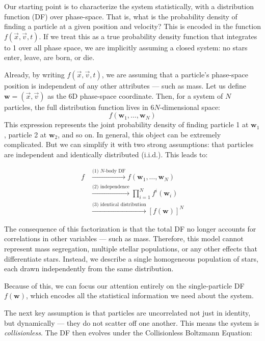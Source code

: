         Our starting point is to characterize the system statistically, with a distribution function (DF) over phase-space. That is, what is the probability density of finding a particle at a given position and velocity? This is encoded in the function \( f(\vec{x}, \vec{v}, t) \). If we treat this as a true probability density function that integrates to 1 over all phase space, we are implicitly assuming a closed system: no stars enter, leave, are born, or die.

        Already, by writing \( f(\vec{x}, \vec{v}, t) \), we are assuming that a particle's phase-space position is independent of any other attributes — such as mass. Let us define \( \mathbf{w} = (\vec{x}, \vec{v}) \) as the 6D phase-space coordinate. Then, for a system of \( N \) particles, the full distribution function lives in \(6N\)-dimensional space:  
        \[
        f(\mathbf{w}_1, \dots, \mathbf{w}_N)
        \]  
        This expression represents the joint probability density of finding particle 1 at \( \mathbf{w}_1 \), particle 2 at \( \mathbf{w}_2 \), and so on. In general, this object can be extremely complicated. But we can simplify it with two strong assumptions: that particles are independent and identically distributed (i.i.d.). This leads to:

        \[
        \begin{array}{rl}
        f 
        & \stackrel{\text{(1) $N$-body DF}}{\longrightarrow} 
        f(\mathbf{w}_1, \dots, \mathbf{w}_N) \\[2ex]
        & \stackrel{\text{(2) independence}}{\longrightarrow} 
        \prod_{i=1}^N f^i(\mathbf{w}_i) \\[2ex]
        & \stackrel{\text{(3) identical distribution}}{\longrightarrow} 
        \left[ f(\mathbf{w}) \right]^N
        \end{array}
        \]

        The consequence of this factorization is that the total DF no longer accounts for correlations in other variables — such as mass. Therefore, this model cannot represent mass segregation, multiple stellar populations, or any other effects that differentiate stars. Instead, we describe a single homogeneous population of stars, each drawn independently from the same distribution.

        Because of this, we can focus our attention entirely on the single-particle DF \( f(\mathbf{w}) \), which encodes all the statistical information we need about the system.

        The next key assumption is that particles are uncorrelated not just in identity, but dynamically — they do not scatter off one another. This means the system is \textit{collisionless}. The DF then evolves under the Collisionless Boltzmann Equation:

